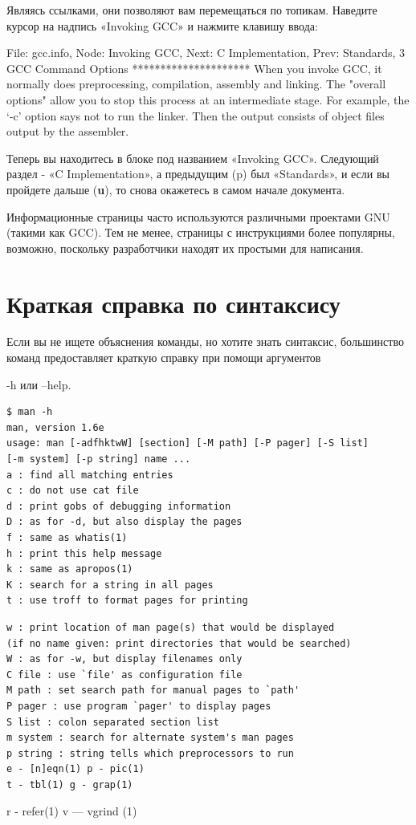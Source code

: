 \documentclass[10pt]{book}
\begin{document}
Являясь ссылками, они позволяют вам перемещаться по топикам. Наведите курсор на надпись «Invoking GCC» и нажмите клавишу ввода:

\vspace{3mm}
\begin{tcolorbox}
File: gcc.info, Node: Invoking GCC, Next: C Implementation, Prev: Standards,
3 GCC Command Options
*********************
When you invoke GCC, it normally does preprocessing, compilation,
assembly and linking. The "overall options" allow you to stop this
process at an intermediate stage. For example, the `-c' option says
not to run the linker. Then the output consists of object files output
by the assembler.
\end{tcolorbox}

Теперь вы находитесь в блоке под названием «Invoking GCC». Следующий раздел - «C Implementation», а предыдущим (p) был «Standards», и если вы пройдете дальше (\textbf{u}), то снова окажетесь в самом начале документа.

Информационные страницы часто используются  различными проектами GNU (такими как GCC). Тем не менее, страницы с инструкциями более популярны, возможно, поскольку разработчики находят их простыми для написания. 

\section{Краткая справка по синтаксису}

Если вы не ищете объяснения команды, но хотите знать синтаксис, большинство команд предоставляет краткую справку при помощи аргументов

\vspace{3mm}
\begin{tcolorbox}
-h или --help.
\begin{lstlisting}
$ man -h
man, version 1.6e
usage: man [-adfhktwW] [section] [-M path] [-P pager] [-S list]
[-m system] [-p string] name ...
a : find all matching entries
c : do not use cat file
d : print gobs of debugging information
D : as for -d, but also display the pages
f : same as whatis(1)
h : print this help message
k : same as apropos(1)
K : search for a string in all pages
t : use troff to format pages for printing
\end{lstlisting}
\end{tcolorbox}
\vspace{3mm}
\begin{tcolorbox}
\begin{lstlisting}
w : print location of man page(s) that would be displayed
(if no name given: print directories that would be searched)
W : as for -w, but display filenames only
C file : use `file' as configuration file
M path : set search path for manual pages to `path'
P pager : use program `pager' to display pages
S list : colon separated section list
m system : search for alternate system's man pages
p string : string tells which preprocessors to run
e - [n]eqn(1) p - pic(1)
t - tbl(1) g - grap(1)
\end{lstlisting}
r - refer(1) v — vgrind (1)
\end{tcolorbox}
\end{document}
